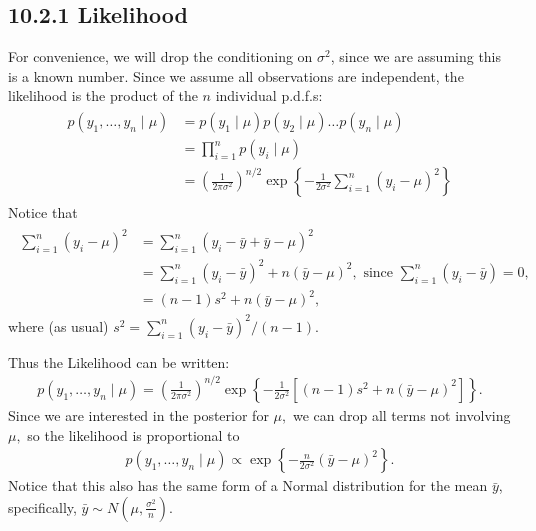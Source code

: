 \documentclass[letterpaper,10pt,english]{jupyterBook}
\begin{document}
\subsection{10.2.1 Likelihood}
\label{\detokenize{10.c. Bayesian Statistics II:likelihood}}
\sphinxAtStartPar
For convenience, we will drop the conditioning on \(\sigma^2\), since we are assuming this is a known number. Since we assume all observations are independent, the likelihood is the product of the \(n\) individual p.d.f.s:
\begin{equation*}
\begin{split}
\begin{align*}
p(y_1,\dots,y_n \mid \mu) 
&= p(y_1 \mid \mu) p(y_2 \mid \mu) \dots p(y_n \mid \mu) \\
&= \prod_{i=1}^n p(y_i \mid \mu) \\
&=
\left( \frac{1}{2\pi \sigma^2}\right)^{n/2} \exp\left\{
-\frac{1}{2\sigma^2}\sum_{i=1}^n(y_i-\mu)^2 \right\}
\end{align*}
\end{split}
\end{equation*}
\sphinxAtStartPar
Notice that
\begin{equation*}
\begin{split}
\begin{align*}
\sum_{i=1}^n (y_i - \mu)^2  &= \sum_{i=1}^n (y_i - \bar
y + \bar y  -
\mu)^2 \\
& = \sum_{i=1}^n (y_i-\bar y)^2 + n(\bar y - \mu)^2, \mbox{ since }
\sum_{i=1}^n (y_i-\bar y)=0,\\
&= (n-1)s^2 + n(\bar y - \mu)^2,
\end{align*}
\end{split}
\end{equation*}
\sphinxAtStartPar
where (as usual) \(s^2 = \sum_{i=1}^n (y_i - \bar y)^2 /(n-1).\)

\sphinxAtStartPar
Thus the Likelihood can be written:
\begin{equation*}
\begin{split}
p(y_1,\dots,y_n \mid \mu) = \left(\frac{1}{2\pi \sigma^2}\right)^{n/2} \exp\left\{
-\frac{1}{2\sigma^2}\left[(n-1)s^2 + n(\bar y - \mu)^2 \right]   \right\}.
\end{split}
\end{equation*}
\sphinxAtStartPar
Since we are interested in the posterior for \(\mu,\) we can drop all terms not involving \(\mu,\) so the likelihood is proportional to
\begin{equation*}
\begin{split}
p(y_1,\dots,y_n \mid \mu) \propto \exp\left\{ -\frac{n}{2\sigma^2} (\bar y - \mu)^2 \right\}.
\end{split}
\end{equation*}
\sphinxAtStartPar
Notice that this also has the same form of a Normal distribution for the mean \(\bar{y}\), specifically, \(\bar{y} \sim N(\mu, \frac{\sigma^2}{n})\).
\end{document}
